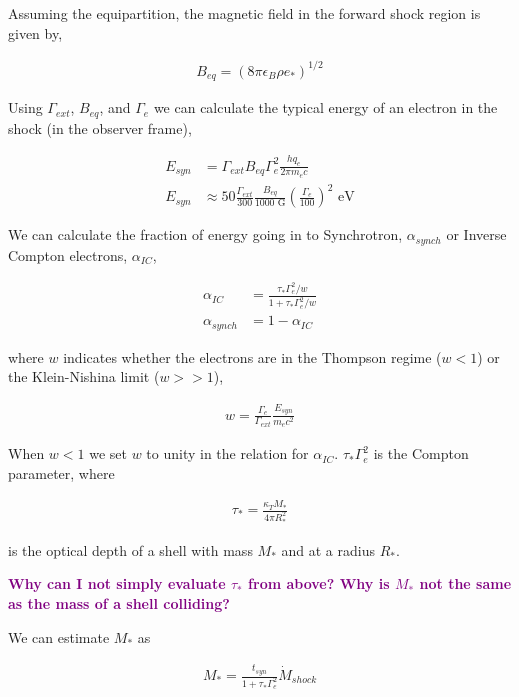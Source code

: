 \documentclass[linenumbers,twocolumn]{aastex631}
\newcommand{\mm}[1]{{\textcolor{purple}{\bf #1}}}
\begin{document}
Assuming the equipartition, the magnetic field in the forward shock region is given by,

\begin{align}
B_{eq} = (8\pi \epsilon_B \rho e_*)^{1/2}
\end{align}

Using $\Gamma_{ext}$, $B_{eq}$, and $\Gamma_e$ we can calculate the typical energy of an electron in the shock (in the observer frame),

\begin{align}
	E_{syn} &= \Gamma_{ext} B_{eq} \Gamma_{e}^2 \frac{hq_e}{2\pi m_e c}\\
	E_{syn} &\approx 50 \frac{\Gamma_{ext}}{300} \frac{B_{eq}}{1000\text{ G}} \left(\frac{\Gamma_e}{100}\right)^{2}\text{ eV}
\end{align}

We can calculate the fraction of energy going in to Synchrotron, $\alpha_{synch}$ or Inverse Compton electrons, $\alpha_{IC}$,

\begin{align}
	\alpha_{IC} &= \frac{\tau_* \Gamma_e^2 / w}{1+ \tau_* \Gamma_e^2 / w}\\
	\alpha_{synch} &= 1-\alpha_{IC}
\end{align} 

where $w$ indicates whether the electrons are in the Thompson regime ($w<1$) or the Klein-Nishina limit ($w>>1$),

\begin{align}
	w = \frac{\Gamma_e}{\Gamma_{ext}} \frac{E_{syn}}{m_e c^2}
\end{align}

When $w<1$ we set $w$ to unity in the relation for $\alpha_{IC}$. $\tau_*\Gamma_e^2$ is the Compton parameter, where

\begin{align} \label{eq: tau}
	\tau_* = \frac{\kappa_T M_*}{4 \pi R_*^2}
\end{align}

is the optical depth of a shell with mass $M_*$ and at a radius $R_*$. 

\mm{Why can I not simply evaluate $\tau_*$ from above? Why is $M_*$ not the same as the mass of a shell colliding?}

We can estimate $M_*$ as

\begin{align} \label{eq: mstar}
	M_* = \frac{t_{syn}}{1+\tau_*\Gamma_e^2}\dot{M}_{shock}
\end{align}
\end{document}
